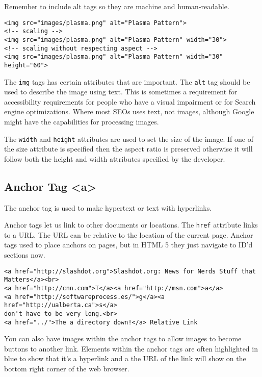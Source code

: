 \documentclass[../CMPUT-404-Notes.tex]{subfiles}
\begin{document}
Remember to include alt tags so they are machine and human-readable.

\begin{verbatim}
<img src="images/plasma.png" alt="Plasma Pattern">
<!-- scaling -->
<img src="images/plasma.png" alt="Plasma Pattern" width="30">
<!-- scaling without respecting aspect -->
<img src="images/plasma.png" alt="Plasma Pattern" width="30" height="60">
\end{verbatim}

The \texttt{img} tags has certain attributes that are important. The \texttt{alt} tag should be used to describe the image using text. 
This is sometimes a requirement for accessibility requirements for people who have a visual impairment or for Search engine optimizations. 
Where most SEOs uses text, not images, although Google might have the capabilities for processing images. 

The \texttt{width} and \texttt{height} attributes are used to set the size of the image. If one of the size attribute is specified then the aspect ratio is preserved otherwise it will follow both the height and width attributes specified by the developer. 

\subsection{Anchor Tag <a>}
The anchor tag is used to make hypertext or text with hyperlinks.

Anchor tags let us link to other documents or locations. The \texttt{href} attribute links to a URL. The URL can be relative to the location of the current page. Anchor tags used to place anchors on pages, but in HTML 5 they just navigate to ID'd sections now.

\begin{verbatim}
<a href="http://slashdot.org">Slashdot.org: News for Nerds Stuff that
Matters</a><br>
<a href="http://cnn.com">T</a><a href="http://msn.com">a</a>
<a href="http://softwareprocess.es/">g</a><a href="http://ualberta.ca">s</a>
don't have to be very long.<br>
<a href="../">The a directory down!</a> Relative Link
\end{verbatim}

You can also have images within the anchor tags to allow images to become buttons to another link. 
Elements within the anchor tags are often highlighted in blue to show that it's a hyperlink and a the URL of the link will show on the bottom right corner of the web browser. 
\end{document}
